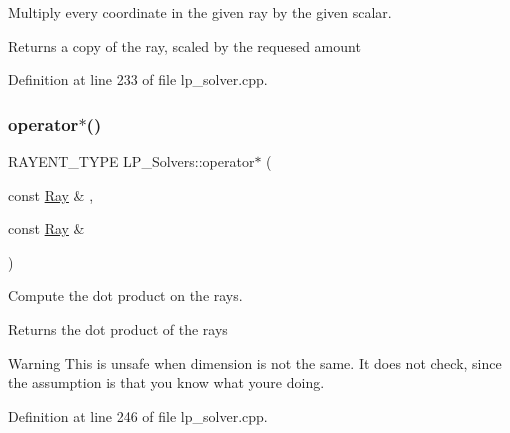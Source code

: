 Multiply every coordinate in the given ray by the given scalar. 

\begin{DoxyReturn}{Returns}
a copy of the ray, scaled by the requesed amount 
\end{DoxyReturn}


Definition at line 233 of file lp\+\_\+solver.\+cpp.

\mbox{\label{group___c_l_s_solvers_gaae1f5d07b6d0f4c12b4c7835977b64eb}} 
\subsubsection{\texorpdfstring{operator$\ast$()}{operator*()}\hspace{0.1cm}{\footnotesize\ttfamily [2/6]}}
{\footnotesize\ttfamily R\+A\+Y\+E\+N\+T\+\_\+\+T\+Y\+PE L\+P\+\_\+\+Solvers\+::operator$\ast$ (\begin{DoxyParamCaption}\item[{const \hyperlink{group___c_l_s_solvers_class_l_p___solvers_1_1_ray}{Ray} \&}]{,  }\item[{const \hyperlink{group___c_l_s_solvers_class_l_p___solvers_1_1_ray}{Ray} \&}]{ }\end{DoxyParamCaption})}



Compute the dot product on the rays. 

\begin{DoxyReturn}{Returns}
the dot product of the rays 
\end{DoxyReturn}
\begin{DoxyWarning}{Warning}
This is unsafe when dimension is not the same. It does not check, since the assumption is that you know what you\textquotesingle{}re doing. 
\end{DoxyWarning}


Definition at line 246 of file lp\+\_\+solver.\+cpp.

\mbox{\label{group___c_l_s_solvers_ga9b4f6991b325c2a42e1f14fc09346277}} 
